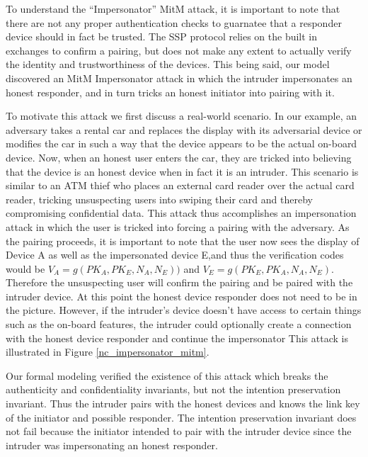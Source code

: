 \documentclass{acm_proc_article-sp}
\begin{document}
To understand the ``Impersonator'' MitM attack, it is important to note that there are not any proper authentication checks to guarnatee that a responder device should in fact be trusted. The SSP protocol relies on the built in exchanges to confirm a pairing, but does not make any extent to actually verify the identity and trustworthiness of the devices. This being said, our model discovered an MitM Impersonator attack in which the intruder impersonates an honest responder, and in turn tricks an honest initiator into pairing with it.

To motivate this attack we first discuss a real-world scenario. In our example, an adversary takes a rental car and replaces the display with its adversarial device or modifies the car in such a way that the device appears to be the actual on-board device. Now, when an honest user enters the car, they are tricked into believing that the device is an honest device when in fact it is an intruder. This scenario is similar to an ATM thief who places an external card reader over the actual card reader, tricking unsuspecting users into swiping their card and thereby compromising confidential data. This attack thus accomplishes an impersonation attack in which the user is tricked into forcing a pairing with the adversary.  As the pairing proceeds, it is important to note that the user now sees the display of Device A as well as the impersonated device E,and thus the verification codes would be $V_A = g(PK_A, PK_E, N_A, N_E))$ and $V_E = g(PK_E, PK_A, N_A, N_E)$. Therefore the  unsuspecting user will confirm the pairing and be paired with the intruder device. At this point the honest device responder does not need to be in the picture. However, if the intruder's device doesn't have access to certain things such as the on-board features,  the intruder could optionally create a connection with the honest device responder and  continue the impersonator This attack is illustrated in Figure \ref{nc_impersonator_mitm}.

Our formal modeling verified the existence of this attack which breaks the authenticity and confidentiality invariants, but not the intention preservation invariant. Thus the intruder pairs with the honest devices and knows the link key of the initiator and possible responder. The intention preservation invariant does not fail because the initiator intended to pair with the intruder device since the intruder was impersonating an honest responder.
\end{document}

